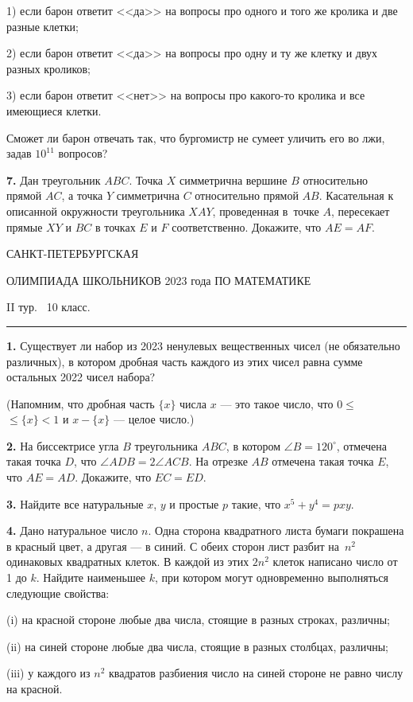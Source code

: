 \documentclass[12pt]{article}
\def\q#1.{{\bf #1. }}
\begin{document}
 1) если барон ответит <<да>> на вопросы про одного и того же кролика и две разные клетки;

 2) если барон ответит <<да>> на вопросы про одну и ту же клетку и двух разных кроликов;

 3) если барон ответит <<нет>> на вопросы про какого-то кролика и все имеющиеся клетки.

Сможет ли барон отвечать так, что бургомистр не сумеет уличить его во лжи, задав $10^{11}$ вопросов?

\q7. Дан треугольник $ABC$. Точка $X$ симметрична вершине $B$ относительно прямой $AC$, а точка $Y$ симметрична $C$ относительно прямой $AB$. Касательная к описанной окружности треугольника $XAY$, проведенная в~точке $A$, пересекает прямые $XY$ и $BC$ в точках $E$ и $F$ соответственно. Докажите, что $AE=AF$.


\clearpage

\centerline{\sc САНКТ-ПЕТЕРБУРГСКАЯ}
\centerline{\sc ОЛИМПИАДА ШКОЛЬНИКОВ 2023 года ПО МАТЕМАТИКЕ}
\centerline{\sc II тур. \ 10 класс.}
\medskip
\hrule
\medskip

\q1. Существует ли набор из 2023 ненулевых вещественных чисел  (не обязательно различных), в котором
дробная часть каждого из этих чисел равна сумме остальных 2022 чисел набора?
   
(Напомним, что дробная часть $\{x\}$ числа $x$ --- это такое число, что $0\leq $\linebreak$\leq\{x\}<1$ и $x-\{x\}$ --- целое число.)

\q2. На биссектрисе угла $B$ треугольника $ABC$, в котором  $\angle B=120^\circ$, отмечена такая точка $D$, что  $\angle ADB=2\angle ACB$. На
отрезке $AB$ отмечена такая точка $E$, что  $AE=AD$. Докажите, что $EC=ED$.

\q3. Найдите все натуральные $x$, $y$ и простые $p$ такие, что $x^5+y^4=pxy$.

\q4. Дано натуральное число $n$. Одна сторона квадратного листа бумаги покрашена в красный цвет, а другая --- в  синий. С обеих сторон лист разбит на~$n^2$ одинаковых квадратных клеток. В каждой из этих $2 n^2$ клеток написано число от 1 до $k$. Найдите наименьшее $k$, при котором могут одновременно выполняться следующие свойства:

\noindent
(i) на красной стороне любые два числа, стоящие в разных строках, различны;

\noindent
(ii) на синей стороне любые два числа, стоящие в разных столбцах, различны;

\noindent
(iii) у каждого из $n^2$ квадратов разбиения число на синей стороне не равно числу на красной.
\end{document}
